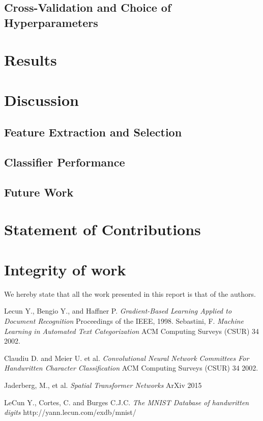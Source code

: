 \documentclass[conference]{IEEEtran}
\begin{document}
\subsection{Cross-Validation and Choice of Hyperparameters}

\section{Results}




\section{Discussion}

\subsection{Feature Extraction and Selection}



\subsection{Classifier Performance}

\subsection{Future Work}



\section{Statement of Contributions}

\section{Integrity of work}
We hereby state that all the work presented in this report is that of the authors.
\begin{thebibliography}{9}

Lecun Y., Bengio Y., and Haffner P.
 \emph{Gradient-Based Learning Applied to Document Recognition}
 Proceedings of the IEEE,
 1998.
 Sebastini, F.
  \emph{Machine Learning in Automated Text Categorization}
  ACM Computing Surveys (CSUR) 34
  2002.

 Claudiu D. and Meier U. et al.
  \emph{Convolutional Neural Network Committees For Handwritten Character
Classification}
  ACM Computing Surveys (CSUR) 34
  2002.

 Jaderberg, M., et al.
  \emph{Spatial Transformer Networks}
  ArXiv
  2015

LeCun Y., Cortes, C. and Burges C.J.C.
	\emph{The MNIST Database of handwritten digits}
	http://yann.lecun.com/exdb/mnist/
\end{thebibliography}
\end{document}
